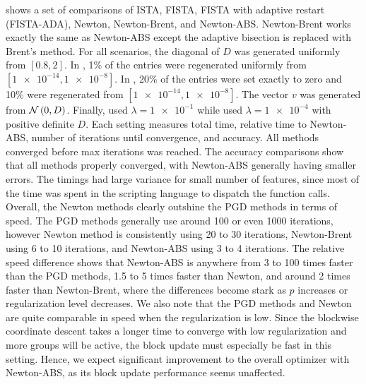  shows a set of comparisons
of ISTA, FISTA, FISTA with adaptive restart (FISTA-ADA),
Newton, Newton-Brent, and Newton-ABS.
Newton-Brent works exactly the same as Newton-ABS except
the adaptive bisection is replaced with Brent's method.
For all scenarios, the diagonal of $D$ was generated uniformly from $[0.8, 2]$.
In , 1\% of the entries were
regenerated uniformly from $[\num{1e-14}, \num{1e-8}]$.
In , 20\% of the entries were
set exactly to zero and 10\% were regenerated from $[\num{1e-14}, \num{1e-8}]$.
The vector $v$ was generated from $\mathcal{N}\left(0, D\right)$.
Finally, 
used $\lambda=\num{1e-1}$ 
while  used $\lambda=\num{1e-4}$
with positive definite $D$.
Each setting measures total time, relative time to Newton-ABS,
number of iterations until convergence, and accuracy.
All methods converged before max iterations was reached.
The accuracy comparisons show that all methods properly converged,
with Newton-ABS generally having smaller errors.
The timings had large variance for small number of features,
since most of the time was spent in the scripting language to dispatch the function calls.
Overall, the Newton methods clearly outshine the PGD methods in terms of speed.
The PGD methods generally use around 100 or even 1000 iterations,
however Newton method is consistently using 20 to 30 iterations,
Newton-Brent using 6 to 10 iterations,
and Newton-ABS using 3 to 4 iterations.
The relative speed difference shows that Newton-ABS is anywhere from 3 to 100 times faster
than the PGD methods, 1.5 to 5 times faster than Newton, and around 2 times faster than Newton-Brent,
where the differences become stark as $p$ increases or regularization level decreases.
We also note that the PGD methods and Newton are quite comparable in speed
when the regularization is low. 
Since the blockwise coordinate descent takes a longer time to converge with low regularization
and more groups will be active, the block update must especially be fast in this setting.
Hence, we expect significant improvement to the overall optimizer with Newton-ABS,
as its block update performance seems unaffected.

